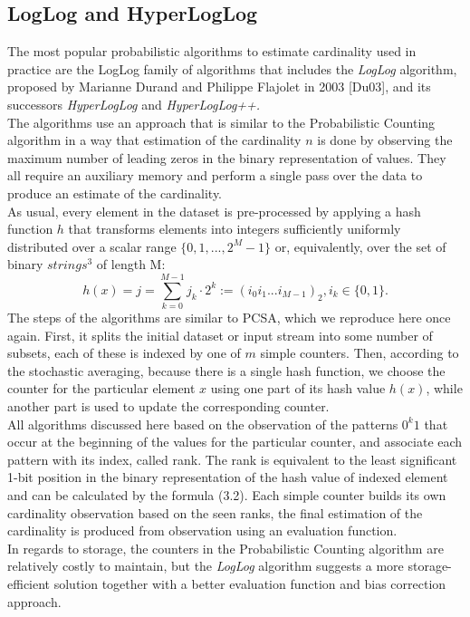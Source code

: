 \documentclass[a4paper,13pt]{article}
\theoremstyle{mytheor}
\begin{document}
\subsection{LogLog and HyperLogLog}
The most popular probabilistic algorithms to estimate cardinality used
in practice are the LogLog family of algorithms that includes the \textit{LogLog}
algorithm, proposed by Marianne Durand and Philippe Flajolet in
2003 [Du03], and its successors \textit{HyperLogLog} and \textit{HyperLogLog++.}\\
\indent The algorithms use an approach that is similar to the Probabilistic
Counting algorithm in a way that estimation of the cardinality $n$ is done
by observing the maximum number of leading zeros in the binary representation of values.
They all require an auxiliary memory and perform a single pass over the data to
produce an estimate of the cardinality.\\
\indent As usual, every element in the dataset is pre-processed by applying
a hash function $h$ that transforms elements into integers sufficiently
uniformly distributed over a scalar range $\{0,1,...,2^M-1\}$ or, equivalently,
over the set of binary $strings^3$ of length M:
\[
    h(x) = j = \sum\limits_{k=0}^{M-1}j_k\cdot2^k := \left(i_0i_1...i_{M-1}\right)_2,i_k \in \{0,1\}.    
\]
\indent The steps of the algorithms are similar to PCSA, which we reproduce
here once again. First, it splits the initial dataset or input stream into
some number of subsets, each of these is indexed by one of $m$ simple
counters. Then, according to the stochastic averaging, because there is
a single hash function, we choose the counter for the particular element $x$
using one part of its hash value $h(x)$, while another part is used to update
the corresponding counter.\\
\indent All algorithms discussed here based on the observation of
the patterns $0^k1$ that occur at the beginning of the values for
the particular counter, and associate each pattern with its index, called
rank. The rank is equivalent to the least significant 1-bit position in
the binary representation of the hash value of indexed element and can
be calculated by the formula (3.2). Each simple counter builds its own
cardinality observation based on the seen ranks, the final estimation of
the cardinality is produced from observation using an evaluation function.\\
\indent In regards to storage, the counters in the Probabilistic Counting
algorithm are relatively costly to maintain, but the \textit{LogLog} algorithm
suggests a more storage-efficient solution together with a better
evaluation function and bias correction approach.
\end{document}
